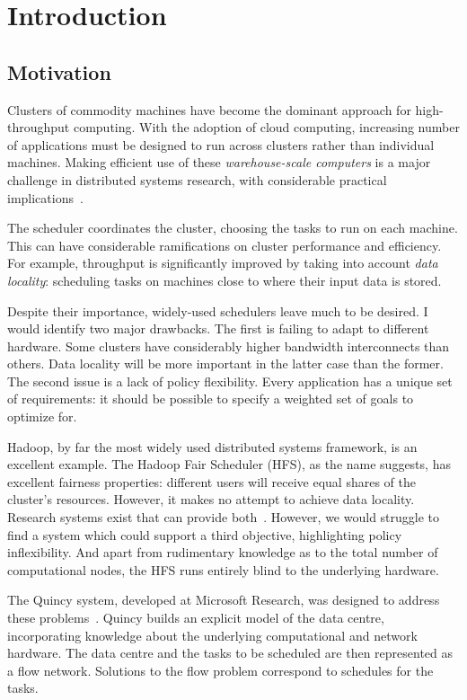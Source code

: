 \chapter{Introduction} \label{chap:intro}

\section{Motivation} \label{sec:intro-motivation}
Clusters of commodity machines have become the dominant approach for high-throughput computing. With the adoption of cloud computing, increasing number of applications must be designed to run across clusters rather than individual machines. Making efficient use of these \emph{warehouse-scale computers} is a major challenge in distributed systems research, with considerable practical implications~\cite{WarehouseScale:2009}.

The scheduler coordinates the cluster, choosing the tasks to run on each machine. This can have considerable ramifications on cluster performance and efficiency. For example, throughput is significantly improved by taking into account \emph{data locality}: scheduling tasks on machines close to where their input data is stored. 

Despite their importance, widely-used schedulers leave much to be desired. I would identify two major drawbacks. The first is failing to adapt to different hardware. Some clusters have considerably higher bandwidth interconnects than others. Data locality will be more important in the latter case than the former. The second issue is a lack of policy flexibility. Every application has a unique set of requirements: it should be possible to specify a weighted set of goals to optimize for.

Hadoop, by far the most widely used distributed systems framework, is an excellent example. The Hadoop Fair Scheduler (HFS), as the name suggests, has excellent fairness properties: different users will receive equal shares of the cluster's resources. However, it makes no attempt to achieve data locality. Research systems exist that can provide both~\cite{Zaharia:2010}. However, we would struggle to find a system which could support a third objective, highlighting policy inflexibility. And apart from rudimentary knowledge as to the total number of computational nodes, the HFS runs entirely blind to the underlying hardware.

The Quincy system, developed at Microsoft Research, was designed to address these problems~\cite{Isard:2009}. Quincy builds an explicit model of the data centre, incorporating knowledge about the underlying computational and network hardware. The data centre and the tasks to be scheduled are then represented as a flow network. Solutions to the flow problem correspond to schedules for the tasks.

